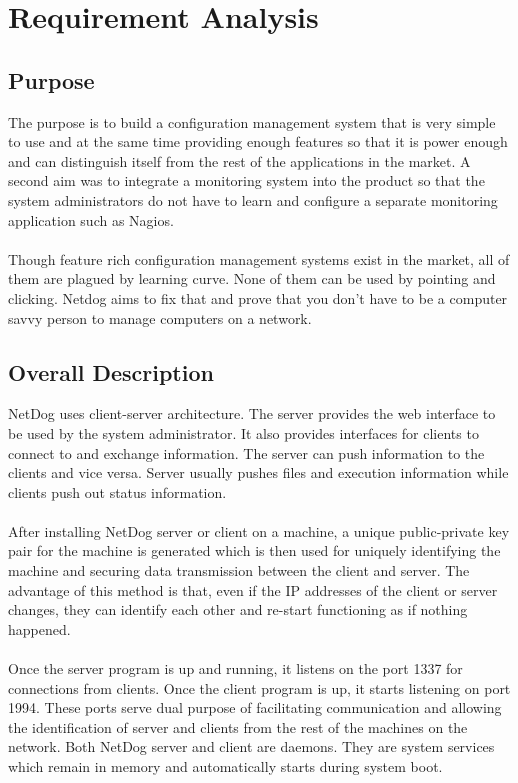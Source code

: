 \chapter{Requirement Analysis}

\section{Purpose}

The purpose is to build a configuration management system that is very simple to
use and at the same time providing enough features so that it is power enough
and can distinguish itself from the rest of the applications in the market. A
second aim was to integrate a monitoring system into the product so that the
system administrators do not have to learn and configure a separate monitoring
application such as Nagios.
\\\\
Though feature rich configuration management systems exist in the market, all of
them are plagued by learning curve. None of them can be used by pointing and
clicking. Netdog aims to fix that and prove that you don't have to be a computer
savvy person to manage computers on a network.

\section{Overall Description}

NetDog uses client-server architecture. The server provides the web interface to
be used by the system administrator. It also provides interfaces for clients to
connect to and exchange information. The server can push information to the
clients and vice versa. Server usually pushes files and execution information
while clients push out status information.
\\\\
After installing NetDog server or client on a machine, a unique public-private
key pair for the machine is generated which is then used for uniquely
identifying the machine and securing data transmission between the client and
server. The advantage of this method is that, even if the IP addresses of the
client or server changes, they can identify each other and re-start functioning
as if nothing happened.
\\\\
Once the server program is up and running, it listens on the port 1337 for
connections from clients. Once the client program is up, it starts listening on
port 1994. These ports serve dual purpose of facilitating communication and
allowing the identification of server and clients from the rest of the machines
on the network. Both NetDog server and client are daemons. They are system 
services which remain in memory and automatically starts during system boot.\\

